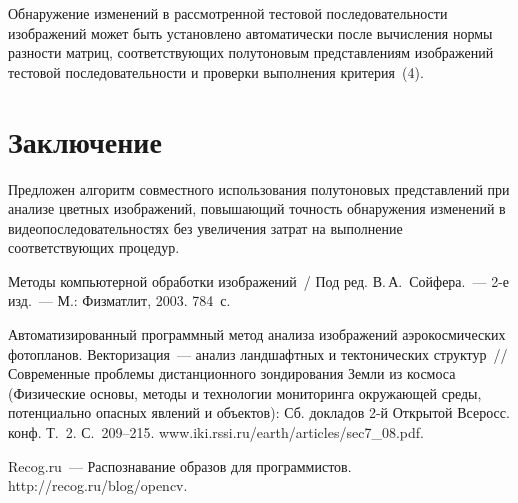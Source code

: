 \begin{multicols}{2}
  Обнаружение изменений в рассмотренной тес\-то\-вой последовательности
изображений может быть установлено автоматически после вычисления нормы
разности матриц, соответствующих полутоновым представлениям
изображений тестовой последовательности и проверки выполнения
критерия~(4).

\vspace*{-10pt}

\section{Заключение}

\vspace*{-2pt}

  Предложен алгоритм совместного использования полутоновых
представлений при анализе цветных изображений, повышающий точность
обнаружения изменений в видеопоследовательностях без увеличения затрат на
выполнение соответствующих процедур.

\vspace*{-10pt}

{\small\frenchspacing
 {%
 \begin{thebibliography}{9}

 \vspace*{-2pt}

Методы компьютерной обработки изображений~/ Под ред. В.\,А.~Сойфера.~--- 2-е
изд.~--- М.: Физматлит, 2003. 784~с.

\columnbreak



 Автоматизированный программный \mbox{метод} анализа
изображений аэрокосмических фотопланов. Векторизация~--- анализ
ландшафтных и тек\-то\-ни\-ческих структур~// Современные проб\-ле\-мы
дистан\-ционного зондирования Земли из космо\-са (Физические основы, методы
и технологии мониторинга окружающей среды, потенциально опасных
явлений и объектов): Сб. докладов 2-й Открытой Всеросс. конф.
Т.~2. С.~209--215. {\sf
www.iki.rssi.ru/earth/articles/sec7\_08.pdf}.

\vspace*{9pt}

Recog.ru~--- Распознавание образов для программистов. {\sf
http://recog.ru/blog/opencv}.

\vspace*{9pt}


\end{thebibliography}}}
\end{multicols}
